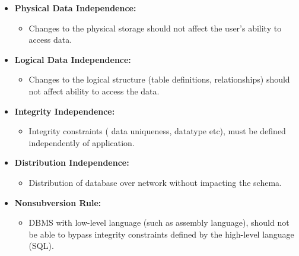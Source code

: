 \begin{flushleft}
\begin{itemize}
		\item \textbf{Physical Data Independence:} 
		\begin{itemize}
			\item Changes to the physical storage should not affect the user's ability to access data.
		\end{itemize}
		
		\item \textbf{Logical Data Independence:} 
		\begin{itemize}
			\item Changes to the logical structure (table definitions, relationships) should not affect ability to access the data.
		\end{itemize}
		
		\item \textbf{Integrity Independence:} 
		\begin{itemize}
			\item Integrity constraints ( data uniqueness, datatype etc), must be defined independently of application.
		\end{itemize}
		
		
		\item \textbf{Distribution Independence:}
		\begin{itemize}
			\item Distribution of database over network without impacting the schema.
		\end{itemize} 
	
		\item \textbf{Nonsubversion Rule:} 
		\begin{itemize}
			\item DBMS with low-level language (such as assembly language), should not be able to bypass integrity constraints defined by the high-level language (SQL).
		\end{itemize}
		
	\end{itemize}

\end{flushleft}


